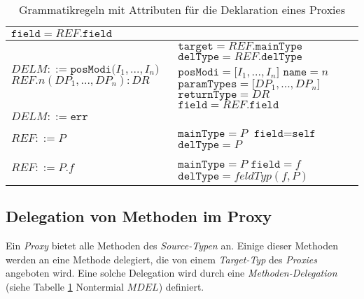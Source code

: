 \begin{table}[h!]
\begin{tabular}{|p{6cm}|p{8cm}|}
$\texttt{field} = \mathit{REF}\texttt{.field}$
\\
\hline
$\mathit{DELM} ::=\texttt{posModi(} \mathit{I_1},...,\mathit{I_n} \texttt{)}$\newline
$\mathit{REF}\texttt{.}n(\mathit{DP_1},...,\mathit{DP_n}):DR $  
&
$\texttt{target} = \mathit{REF}.\texttt{mainType}$\newline
$\texttt{delType} = \mathit{REF}.\texttt{delType}$\newline
$\texttt{posModi} = \mathit{[I_1},...,\mathit{I_n]}$\newline
$\texttt{name} = \mathit{n}$\newline
$\texttt{paramTypes} = \mathit{[DP_1},...,\mathit{DP_n]}$\newline
$\texttt{returnType} = \mathit{DR}$\newline
$\texttt{field} = \mathit{REF}\texttt{.field}$
\\
\hline
$\mathit{DELM} ::= \texttt{err} $  
&
\\
\hline
$\mathit{REF} ::= \mathit{P}$
& 
$\texttt{mainType} = \mathit{P}$\newline
$\texttt{field} = \texttt{self}$\newline
$\texttt{delType} = \mathit{P}$
\\
\hline
$\mathit{REF} ::= \mathit{P}\texttt{.}\mathit{f}$
&
$\texttt{mainType} = \mathit{P}$\newline
$\texttt{field} = \mathit{f}$\newline
$\texttt{delType} = \mathit{feldTyp(f,P)}$
\\
\hline
\end{tabular}
\caption{Grammatikregeln mit Attributen für die Deklaration eines Proxies}
 \label{tab:attrGrProxies}
\end{table}
\noindent
\subsection{Delegation von Methoden im Proxy}
Ein \emph{Proxy} bietet alle Methoden des \emph{Source-Typen} an. Einige dieser Methoden werden an eine Methode delegiert, die von einem \emph{Target-Typ} des \emph{Proxies} angeboten wird. Eine solche Delegation wird durch eine \emph{Methoden-Delegation} (siehe Tabelle \ref{tab:attrGrProxies} Nontermial $\mathit{MDEL}$) definiert.
